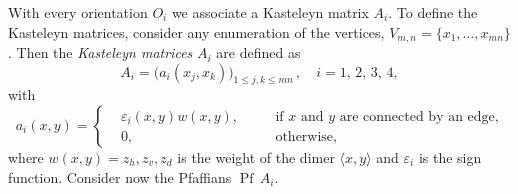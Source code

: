 \documentclass[12pt,reqno]{amsart}
\numberwithin{equation}{section}
\newcommand{\ep}{\varepsilon}
\newcommand{\Pf}{{\operatorname{Pf}\,}}
\begin{document}
With every orientation $O_i$ we associate a Kasteleyn matrix $A_i$.
To define the Kasteleyn matrices, consider any enumeration of the vertices,
$V_{m,n}=\{x_1,\ldots,x_{mn}\}$. Then the \textit{Kasteleyn matrices} $A_i$ 
are defined as
\begin{equation}\label{Aj1}
A_i=\big(a_i(x_j,x_k)\big)_{1\le j,k\le mn}\,,\quad i=1,\,2,\,3,\,4,
\end{equation}
with
\begin{equation}\label{Aj2}
a_i(x,y)=\left\{
\begin{alignedat}{2}
&\ep_i(x,y) w(x,y),\quad &&\textrm{if $x$ and $y$ are connected by an edge,}\\
& 0, \quad &&\textrm{otherwise,}
\end{alignedat}\right.
\end{equation}
where $w(x,y)=z_h,z_v,z_d$ is the weight of the dimer $\langle x,y\rangle$
and $\ep_i$ is the sign function. Consider now the Pfaffians $\Pf A_i$.
\end{document}

